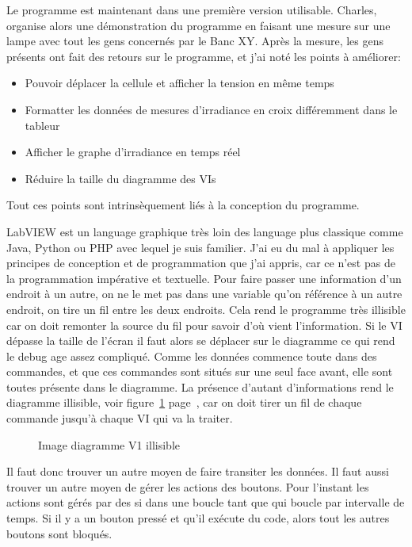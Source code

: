 \documentclass[a4paper, 12pt]{article}
\begin{document}
Le programme est maintenant dans une première version utilisable.  Charles, organise alors une démonstration du programme en faisant une mesure sur une lampe avec tout les gens concernés par le Banc XY.
Après la mesure, les gens présents ont fait des retours sur le programme, et j'ai noté les points à améliorer:
\begin{itemize}
	\item Pouvoir déplacer la cellule et afficher la tension en même temps
	\item Formatter les données de mesures d'irradiance en croix différemment dans le tableur
	\item Afficher le graphe d'irradiance en temps réel
	\item Réduire la taille du diagramme des VIs
\end{itemize}

Tout ces points sont intrinsèquement liés à la conception du programme.

LabVIEW est un language graphique très loin des language plus classique comme Java, Python ou PHP avec lequel je suis familier.
J'ai eu du mal à appliquer les principes de conception et de programmation que j'ai appris, car ce n'est pas de la programmation impérative et textuelle.
Pour faire passer une information d'un endroit à un autre, on ne le met pas dans une variable qu'on référence à un autre endroit, on tire un fil entre les deux endroits. 
Cela rend le programme très illisible car on doit remonter la source du fil pour savoir d'où vient l'information.
Si le VI dépasse la taille de l'écran il faut alors se déplacer sur le diagramme ce qui rend le debug age assez compliqué.
Comme les données commence toute dans des commandes, et que ces commandes sont situés sur une seul face avant, elle sont toutes présente dans le diagramme.
La présence d'autant d'informations rend le diagramme illisible, voir figure~\ref{fig:diagrammeV1} page~\pageref{fig:diagrammeV1}, car on doit tirer un fil de chaque commande jusqu'à chaque VI qui va la traiter.

\begin{figure}[p]
	\centering
	\caption{Image diagramme V1 illisible}
	\label{fig:diagrammeV1}
\end{figure}


Il faut donc trouver un autre moyen de faire transiter les données.
Il faut aussi trouver un autre moyen de gérer les actions des boutons.
Pour l'instant les actions sont gérés par des si dans une boucle tant que qui boucle par intervalle de temps. Si il y a un bouton pressé et qu'il exécute du code, alors tout les autres boutons sont bloqués.
\end{document}
